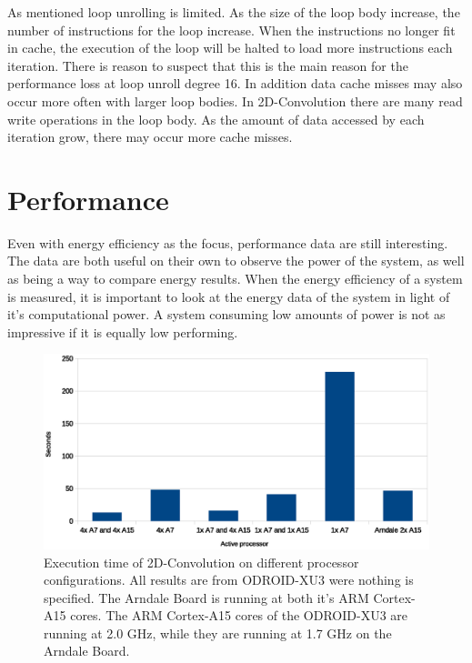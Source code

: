 As mentioned loop unrolling is limited.
As the size of the loop body increase, the number of instructions for the loop increase.
When the instructions no longer fit in cache, the execution of the loop will be halted to load more instructions each iteration.
There is reason to suspect that this is the main reason for the performance loss at loop unroll degree 16.
In addition data cache misses may also occur more often with larger loop bodies.
In 2D-Convolution there are many read write operations in the loop body.
As the amount of data accessed by each iteration grow, there may occur more cache misses.

\section{Performance}
Even with energy efficiency as the focus, performance data are still interesting.
The data are both useful on their own to observe the power of the system, as well as being a way to compare energy results.
When the energy efficiency of a system is measured, it is important to look at the energy data of the system in light of it's computational power.
A system consuming low amounts of power is not as impressive if it is equally low performing.

\begin{figure}[H]
  \centering
  \includegraphics[width=160mm]{fig/execution-time-configurations.eps}
  \caption{Execution time of 2D-Convolution on different processor configurations. All results are from ODROID-XU3 were nothing is specified. The Arndale Board is running at both it's ARM Cortex-A15 cores. The ARM Cortex-A15 cores of the ODROID-XU3 are running at 2.0 GHz, while they are running at 1.7 GHz on the Arndale Board. \label{execution-time-configurations}}
\end{figure}


